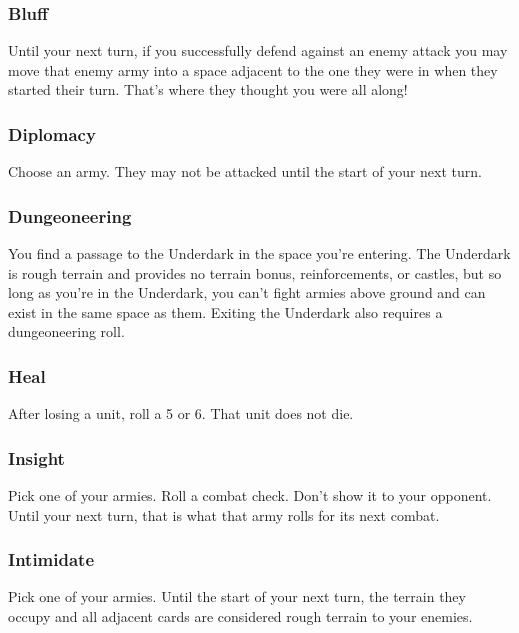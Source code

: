 \documentclass{article}
\begin{document}
\subsubsection{Bluff}

Until your next turn, if you successfully defend against an enemy attack you may move that enemy army into a space adjacent to the one they were in when they started their turn.  That's where they thought you were all along!

\subsubsection{Diplomacy}

Choose an army.  They may not be attacked until the start of your next turn.

\subsubsection{Dungeoneering}

You find a passage to the Underdark in the space you're entering.  The Underdark is rough terrain and provides no terrain bonus, reinforcements, or castles, but so long as you're in the Underdark, you can't fight armies above ground and can exist in the same space as them.  Exiting the Underdark also requires a dungeoneering roll.

\subsubsection{Heal}

After losing a unit, roll a 5 or 6.  That unit does not die.

\subsubsection{Insight}

Pick one of your armies.  Roll a combat check.  Don't show it to your opponent.  Until your next turn, that is what that army rolls for its next combat.

\subsubsection{Intimidate}

Pick one of your armies.  Until the start of your next turn, the terrain they occupy and all adjacent cards are considered rough terrain to your enemies.
\end{document}
